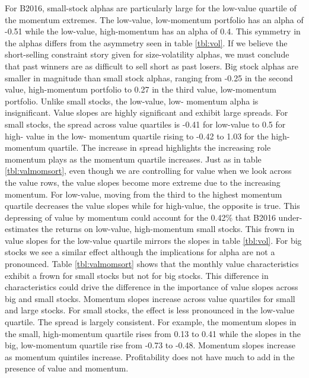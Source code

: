 For B2016, small-stock alphas are particularly large for the low-value quartile of the
momentum extremes. The low-value, low-momentum portfolio has an alpha of -0.51 while the
low-value, high-momentum has an alpha of 0.4. This symmetry in the alphas differs from the
asymmetry seen in table \ref{tbl:vol}. If we believe the short-selling constraint story
given for size-volatility alphas, we must conclude that past winners are as difficult to
sell short as past losers. Big stock alphas are smaller in magnitude than small stock
alphas, ranging from -0.25 in the second value, high-momentum portfolio to 0.27 in the
third value, low-momentum portfolio. Unlike small stocks, the low-value, low- momentum
alpha is insignificant. Value slopes are highly significant and exhibit large spreads. For
small stocks, the spread across value quartiles is -0.41 for low-value to 0.5 for high-
value in the low- momentum quartile rising to -0.42 to 1.03 for the high-momentum
quartile. The increase in spread highlights the increasing role momentum plays as the
momentum quartile increases. Just as in table \ref{tbl:valmomsort}, even though we are
controlling for value when we look across the value rows, the value slopes become more
extreme due to the increasing momentum. For low-value, moving from the third to the
highest momentum quartile decreases the value slopes while for high-value, the opposite is
true. This depressing of value by momentum could account for the 0.42\% that B2016 under-
estimates the returns on low-value, high-momentum small stocks. This frown in value slopes
for the low-value quartile mirrors the slopes in table \ref{tbl:vol}. For big stocks we
see a similar effect although the implications for alpha are not a pronounced. Table
\ref{tbl:valmomsort} shows that the monthly value characteristics exhibit a frown for
small stocks but not for big stocks. This difference in characteristics could drive the
difference in the importance of value slopes across big and small stocks. Momentum slopes
increase across value quartiles for small and large stocks. For small stocks, the effect
is less pronounced in the low-value quartile. The spread is largely consistent. For
example, the momentum slopes in the small, high-momentum quartile rises from 0.13 to 0.41
while the slopes in the big, low-momentum quartile rise from -0.73 to -0.48. Momentum
slopes increase as momentum quintiles increase. Profitability does not have much to add in
the presence of value and momentum.

